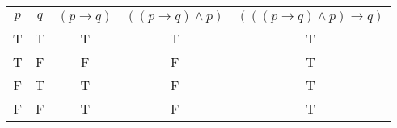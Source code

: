 \begin{tabular}{|c|c||c|c|c|}
\hline
$ p $ & $ q $ & $ (p \rightarrow q) $ & $ ((p \rightarrow q) \wedge p) $ & $ (((p \rightarrow q) \wedge p) \rightarrow q) $ \\
\hline
T & T & T & T & T \\
T & F & F & F & T \\
F & T & T & F & T \\
F & F & T & F & T \\
\hline
\end{tabular}

